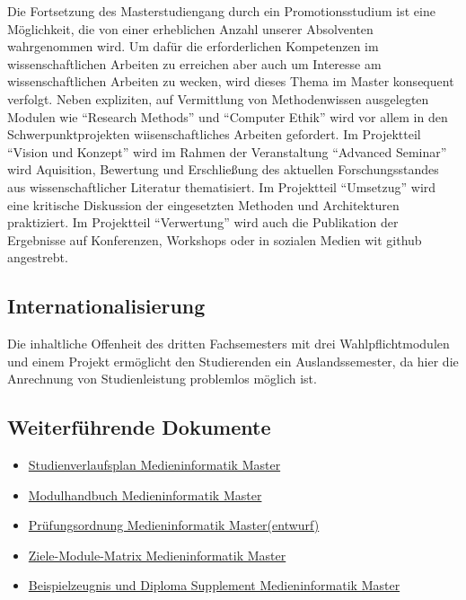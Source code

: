 Die Fortsetzung des Masterstudiengang durch ein Promotionsstudium ist
eine Möglichkeit, die von einer erheblichen Anzahl unserer Absolventen
wahrgenommen wird. Um dafür die erforderlichen Kompetenzen im
wissenschaftlichen Arbeiten zu erreichen aber auch um Interesse am
wissenschaftlichen Arbeiten zu wecken, wird dieses Thema im Master
konsequent verfolgt. Neben expliziten, auf Vermittlung von
Methodenwissen ausgelegten Modulen wie ``Research Methods'' und
``Computer Ethik'' wird vor allem in den Schwerpunktprojekten
wiisenschaftliches Arbeiten gefordert. Im Projektteil ``Vision und
Konzept'' wird im Rahmen der Veranstaltung ``Advanced Seminar'' wird
Aquisition, Bewertung und Erschließung des aktuellen Forschungsstandes
aus wissenschaftlicher Literatur thematisiert. Im Projektteil
``Umsetzug'' wird eine kritische Diskussion der eingesetzten Methoden
und Architekturen praktiziert. Im Projektteil ``Verwertung'' wird auch
die Publikation der Ergebnisse auf Konferenzen, Workshops oder in
sozialen Medien wit github angestrebt.

\subsection{Internationalisierung}\label{internationalisierung}

Die inhaltliche Offenheit des dritten Fachsemesters mit drei
Wahlpflichtmodulen und einem Projekt ermöglicht den Studierenden ein
Auslandssemester, da hier die Anrechnung von Studienleistung problemlos
möglich ist.

\subsection{Weiterführende
Dokumente}\label{weiterfuxfchrende-dokumente-4}

\begin{itemize}
\tightlist
\item
  \href{https://th-koeln.github.io/mi-2017/anhaenge/ma-studienverlaufsplan.pdf}{Studienverlaufsplan
  Medieninformatik Master}
\item
  \href{../download/modulbeschreibungen-master.pdf}{Modulhandbuch
  Medieninformatik Master}
\item
  \href{https://th-koeln.github.io/mi-2017/anhaenge/ma-MIMPO_Entwurf_20170218.pdf}{Prüfungsordnung
  Medieninformatik Master(entwurf)}
\item
  \href{https://th-koeln.github.io/mi-2017/anhaenge/ma-Ziele-Module-Matrix-Medieninformatik-Master.pdf}{Ziele-Module-Matrix
  Medieninformatik Master}
\item
  \href{https://th-koeln.github.io/mi-2017/anhaenge/ma-zeugnis.pdf}{Beispielzeugnis und Diploma
  Supplement Medieninformatik Master}
\end{itemize}

